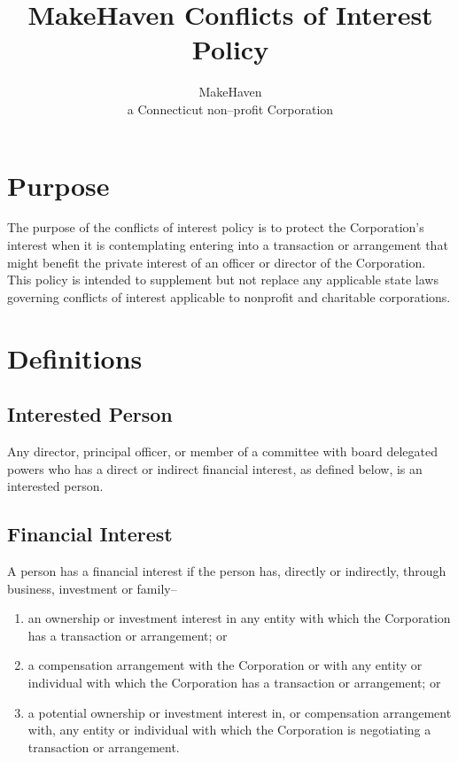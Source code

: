 \documentclass[12pt]{article}
\title{MakeHaven Conflicts of Interest Policy}
\author{MakeHaven\\a Connecticut non--profit Corporation}
\begin{document}
\maketitle



\section{Purpose}

The purpose of the conflicts of interest policy is to protect the 
Corporation's interest when it is contemplating entering into a 
transaction or arrangement that might benefit the private 
interest of an officer or director of the Corporation. This 
policy is intended to supplement but not replace any applicable 
state laws governing conflicts of interest applicable to 
nonprofit and charitable corporations. 

\section{Definitions}

\subsection{Interested Person}

Any director, principal officer, or member of a committee with 
board delegated powers who has a direct or indirect financial 
interest, as defined below, is an interested person.

\subsection{Financial Interest} 

A person has a financial interest if the person has, directly or 
indirectly, through business, investment or family-- 
\begin{enumerate}
  \item an ownership or investment interest in any entity with 
which the Corporation has a transaction or arrangement; or 
  \item a compensation arrangement with the Corporation or with 
any entity or individual with which the Corporation has a 
transaction or arrangement; or 
  \item a potential ownership or investment interest in, or 
compensation arrangement with, any entity or individual with 
which the Corporation is negotiating a transaction or 
arrangement. 

\end{enumerate}
\end{document}

